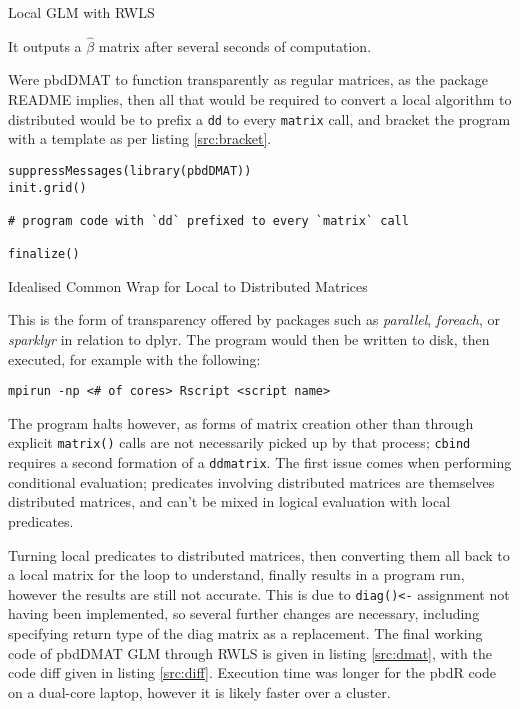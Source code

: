 \documentclass[a4paper,10pt]{article}
\begin{document}
\begin{listing}
\inputminted{r}{R/review-rwls.R}
	\caption{Local GLM with RWLS}
	\label{src:local-rwls}
\end{listing}

It outputs a \(\hat{\beta}\) matrix after several seconds of computation.

Were pbdDMAT to function transparently as regular matrices, as the package
README implies, then all that would be required to convert a local algorithm to
distributed would be to prefix a \texttt{dd} to every \texttt{matrix} call, and
bracket the program with a template as per listing \ref{src:bracket}.

\begin{listing}
\begin{verbatim}
suppressMessages(library(pbdDMAT))
init.grid()

# program code with `dd` prefixed to every `matrix` call

finalize()
\end{verbatim}
\caption={Idealised Common Wrap for Local to Distributed Matrices}\label{src:bracket}
\end{listing}

This is the form of transparency offered by packages such as \textit{parallel},
\textit{foreach}, or \textit{sparklyr} in relation to dplyr.
The program would then be written to disk, then executed, for example with the
following:

\begin{listing}
\begin{verbatim}
mpirun -np <# of cores> Rscript <script name>
\end{verbatim}
\end{listing}

The program halts however, as forms of matrix creation other than through
explicit \texttt{matrix()} calls are not necessarily picked up by that process;
\texttt{cbind} requires a second formation of a \texttt{ddmatrix}. The first
issue comes when performing conditional evaluation;
predicates involving distributed matrices are themselves distributed matrices,
and can't be mixed in logical evaluation with local predicates.

Turning local predicates to distributed matrices, then converting them all back
to a local matrix for the loop to understand, finally results in a program run,
however the results are still not accurate.  This is due to \texttt{diag()<-}
assignment not having been implemented, so several further changes are
necessary, including specifying return type of the diag matrix as a replacement.
The final working code of pbdDMAT GLM through RWLS is given in listing
\ref{src:dmat}, with the code diff given in listing \ref{src:diff}.
Execution time was longer for the pbdR code on a dual-core laptop, however it
is likely faster over a cluster.
\end{document}
